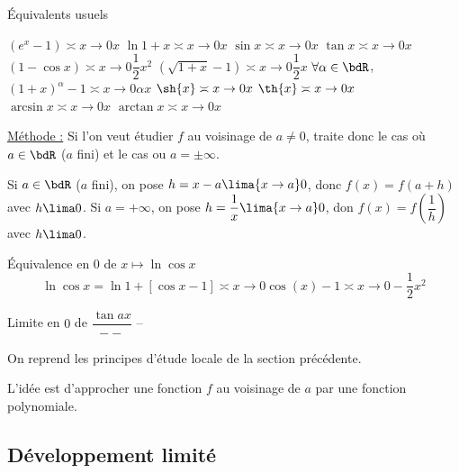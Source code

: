 \documentclass[a4paper,french,bookmarks]{article}
\begin{document}
\begin{theorem}{Équivalents usuels}{}
    \begin{enumerate}
    \begin{multicols}{2}

        \itarr $\left(e^x -1\right) \asymp{x \to 0} x$
        \itarr $\ln{1+x} \asymp{x \to 0} x$
        \itarr $\sin{x} \asymp{x \to 0}  x$
        \itarr $\tan{x}\asymp{x \to 0}  x$
        \itarr $\left(1-\cos{x}\right) \asymp{x \to 0}  \dfrac{1}{2}x^2$
        \itarr $\left(\sqrt{1+x} -1\right) \asymp{x \to 0}  \dfrac{1}{2}x$
        \itarr $\forall \alpha \in \bdR$, $\left(1+x\right)^\alpha -1 \asymp{x \to 0}  \alpha x$
        \itarr $\sh{x} \asymp{x \to 0}  x$
        \itarr $\th{x} \asymp{x \to 0}  x$
        \itarr $\arcsin{x} \asymp{x \to 0}  x$
        \itarr $\arctan{x} \asymp{x \to 0}  x$
    \end{multicols}
    \end{enumerate}
\end{theorem}
\underline{Méthode :} Si l'on veut étudier $f$ au voisinage de $a \neq 0$, traite donc le cas où $a \in \bdR$ ($a$ fini) et le cas ou $a = \pm \infty$.

\begin{enumerate}
    \itarr Si $a \in \bdR$ ($a$ fini), on pose $h = x- a \lima{x \to a} 0$, donc $f(x)=f(a+h)$ avec $h \lima 0$.
    \itarr Si $a = +\infty$, on pose $h = \dfrac{1}{x} \lima{x \to a} 0$, don $f(x)=f\left(\dfrac{1}{h}\right)$ avec $h \lima 0$.
\end{enumerate}

\begin{example}{}{}
    Équivalence en $0$ de $ x \mapsto \ln{\cos{x}}$
    \tcblower
    \[ \ln{\cos{x}} = \ln{1 + \left[\cos{x} - 1\right]} \asymp{x \to 0} \cos(x) - 1 \asymp{x \to 0} -\dfrac{1}{2}x^2\]
\end{example}

\begin{example}{}{}
    Limite en $0$ de $\dfrac{\tan{ax}}{--}$
    \tcblower
    --
\end{example}

On reprend les principes d'étude locale de la section précédente.

L'idée est d'approcher une fonction $f$ au voisinage de $a$ par une fonction polynomiale.

\subsection{Développement limité}
\end{document}
